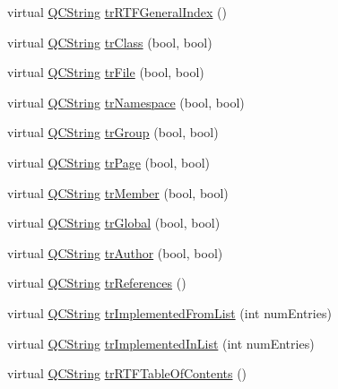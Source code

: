 \begin{DoxyCompactItemize}
\item 
virtual \mbox{\hyperlink{class_q_c_string}{Q\+C\+String}} \mbox{\hyperlink{class_translator_chinese_a7968e2923b5eaf5786248fc3839f516d}{tr\+R\+T\+F\+General\+Index}} ()
\item 
virtual \mbox{\hyperlink{class_q_c_string}{Q\+C\+String}} \mbox{\hyperlink{class_translator_chinese_ac8b43380d40165fb7f6f6e8baff04e3f}{tr\+Class}} (bool, bool)
\item 
virtual \mbox{\hyperlink{class_q_c_string}{Q\+C\+String}} \mbox{\hyperlink{class_translator_chinese_aec3c0a7ad2bfc26114a576fd42c88435}{tr\+File}} (bool, bool)
\item 
virtual \mbox{\hyperlink{class_q_c_string}{Q\+C\+String}} \mbox{\hyperlink{class_translator_chinese_a2ee387435759d7648133e813a574b27d}{tr\+Namespace}} (bool, bool)
\item 
virtual \mbox{\hyperlink{class_q_c_string}{Q\+C\+String}} \mbox{\hyperlink{class_translator_chinese_a245f51a8f8ea56eb5a8802e5ce25760e}{tr\+Group}} (bool, bool)
\item 
virtual \mbox{\hyperlink{class_q_c_string}{Q\+C\+String}} \mbox{\hyperlink{class_translator_chinese_a9ee1adcfb54d28ad2ded307ec2c2d577}{tr\+Page}} (bool, bool)
\item 
virtual \mbox{\hyperlink{class_q_c_string}{Q\+C\+String}} \mbox{\hyperlink{class_translator_chinese_a4011f5d9da39a73cc371e00f0370abaa}{tr\+Member}} (bool, bool)
\item 
virtual \mbox{\hyperlink{class_q_c_string}{Q\+C\+String}} \mbox{\hyperlink{class_translator_chinese_a2c90fe3ee18b178138d85e82085010d1}{tr\+Global}} (bool, bool)
\item 
virtual \mbox{\hyperlink{class_q_c_string}{Q\+C\+String}} \mbox{\hyperlink{class_translator_chinese_a315ef35cadecda32032f4436150ff058}{tr\+Author}} (bool, bool)
\item 
virtual \mbox{\hyperlink{class_q_c_string}{Q\+C\+String}} \mbox{\hyperlink{class_translator_chinese_a2ec6727ed78fb159ee6a95e8aa2132bf}{tr\+References}} ()
\item 
virtual \mbox{\hyperlink{class_q_c_string}{Q\+C\+String}} \mbox{\hyperlink{class_translator_chinese_a84df422ab63903672e55d008055bc7d0}{tr\+Implemented\+From\+List}} (int num\+Entries)
\item 
virtual \mbox{\hyperlink{class_q_c_string}{Q\+C\+String}} \mbox{\hyperlink{class_translator_chinese_a19566de80486f3f2cd62b33bd7f27d86}{tr\+Implemented\+In\+List}} (int num\+Entries)
\item 
virtual \mbox{\hyperlink{class_q_c_string}{Q\+C\+String}} \mbox{\hyperlink{class_translator_chinese_ac3028992d039e52e73e60bf63455dadb}{tr\+R\+T\+F\+Table\+Of\+Contents}} ()

\end{DoxyCompactItemize}
